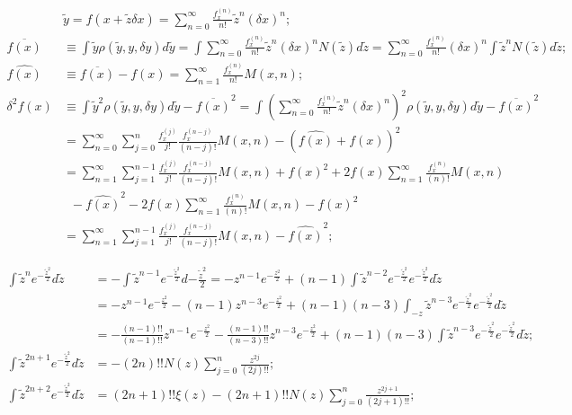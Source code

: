 \documentclass[twoside]{article}
\numberwithin{equation}{section}
\begin{document}
\iffalse

\begin{align*}
& \tilde{y} = f(x + \tilde{z} \delta x) = \sum_{n=0}^{\infty} \frac{f^{(n)}_x}{n!} \tilde{z}^n (\delta x)^n; \\
\overline{f(x)} &\equiv \int \tilde{y} \rho(\tilde{y}, y, \delta y) d \tilde{y}
 = \int \sum_{n=0}^{\infty} \frac{f^{(n)}_x}{n!} \tilde{z}^n (\delta x)^n N(\tilde{z}) d \tilde{z}
 = \sum_{n=0}^{\infty} \frac{f^{(n)}_x}{n!} (\delta x)^{n} \int \tilde{z}^n N(\tilde{z}) d \tilde{z}; \\
\widehat{f(x)} &\equiv \overline{f(x)} - f(x) = \sum_{n=1}^{\infty} \frac{f^{(n)}_x}{n!} M(x,n); \\
\delta^2 f(x) &\equiv \int \tilde{y}^2 \rho(\tilde{y}, y, \delta y) d \tilde{y} - \overline{f(x)}^2
 = \int (\sum_{n=0}^{\infty} \frac{f^{(n)}_x}{n!} \tilde{z}^n (\delta x)^n)^2 \rho(\tilde{y}, y, \delta y) d \tilde{y} - \overline{f(x)}^2 \\
&= \sum_{n=0}^{\infty} \sum_{j=0}^{n} \frac{f^{(j)}_x}{j!} \frac{f^{(n-j)}_x}{(n-j)!} M(x, n)
 - \left(\widehat{f(x)} + f(x) \right)^2 \\
&= \sum_{n=1}^{\infty} \sum_{j=1}^{n-1} \frac{f^{(j)}_x}{j!} \frac{f^{(n-j)}_x}{(n-j)!} M(x, n) + f(x)^2
 + 2 f(x) \sum_{n=1}^{\infty} \frac{f^{(n)}_x}{(n)!} M(x, n) \\
&\;\;- \widehat{f(x)}^2 - 2 f(x) \sum_{n=1}^{\infty} \frac{f^{(n)}_x}{(n)!} M(x, n) - f(x)^2  \\
&= \sum_{n=1}^{\infty} \sum_{j=1}^{n-1} \frac{f^{(j)}_x}{j!} \frac{f^{(n-j)}_x}{(n-j)!} M(x, n) - \widehat{f(x)}^2;
\end{align*}

\begin{align*}
\int \tilde{z}^{n} e^{-\frac{\tilde{z}^2}{2}} d \tilde{z} &= -\int \tilde{z}^{n - 1} e^{-\frac{\tilde{z}^2}{2}} d {-\frac{\tilde{z}^2}{2}}
  = - z^{n-1} e^{-\frac{z^2}{2}} + (n-1) \int \tilde{z}^{n-2} e^{-\frac{\tilde{z}^2}{2}} e^{-\frac{\tilde{z}^2}{2}} d \tilde{z} \\
 &= - z^{n-1} e^{-\frac{z^2}{2}} - (n-1) z^{n-3} e^{-\frac{z^2}{2}} 
  + (n-1) (n-3) \int_{-z} \tilde{z}^{n -3} e^{-\frac{\tilde{z}^2}{2}} e^{-\frac{\tilde{z}^2}{2}} d \tilde{z} \\
 &= - \frac{(n-1)!!}{(n-1)!!} z^{n-1} e^{-\frac{z^2}{2}} - \frac{(n-1)!!}{(n-3)!!} z^{n-3} e^{-\frac{z^2}{2}} 
  + (n-1) (n-3) \int \tilde{z}^{n -3} e^{-\frac{\tilde{z}^2}{2}} e^{-\frac{\tilde{z}^2}{2}} d \tilde{z}; \\
\int \tilde{z}^{2n + 1} e^{-\frac{\tilde{z}^2}{2}} d \tilde{z} &= - (2n)!! N(z) \sum_{j=0}^{n} \frac{z^{2j}}{(2j)!!}; \\
\int \tilde{z}^{2n + 2} e^{-\frac{\tilde{z}^2}{2}} d \tilde{z} &= (2n + 1)!! \xi(z) - (2n + 1)!! N(z) \sum_{j=0}^{n} \frac{z^{2j + 1}}{(2j + 1)!!};
\end{align*}
\end{document}
